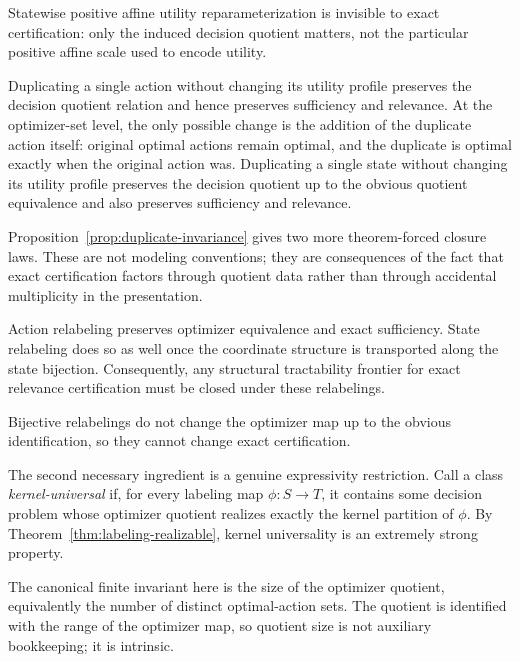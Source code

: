 Statewise positive affine utility reparameterization is invisible to exact certification: only the induced decision quotient matters, not the particular positive affine scale used to encode utility.

\begin{proposition}\label{prop:duplicate-invariance}
Duplicating a single action without changing its utility profile preserves the decision quotient relation and hence preserves sufficiency and relevance. At the optimizer-set level, the only possible change is the addition of the duplicate action itself: original optimal actions remain optimal, and the duplicate is optimal exactly when the original action was. Duplicating a single state without changing its utility profile preserves the decision quotient up to the obvious quotient equivalence and also preserves sufficiency and relevance.
\end{proposition}

Proposition~\ref{prop:duplicate-invariance} gives two more theorem-forced closure laws. These are not modeling conventions; they are consequences of the fact that exact certification factors through quotient data rather than through accidental multiplicity in the presentation.

\begin{proposition}\label{prop:relabeling-forced}
Action relabeling preserves optimizer equivalence and exact sufficiency. State relabeling does so as well once the coordinate structure is transported along the state bijection. Consequently, any structural tractability frontier for exact relevance certification must be closed under these relabelings.
\end{proposition}

Bijective relabelings do not change the optimizer map up to the obvious identification, so they cannot change exact certification.

The second necessary ingredient is a genuine expressivity restriction. Call a class \emph{kernel-universal} if, for every labeling map $\phi : S \to T$, it contains some decision problem whose optimizer quotient realizes exactly the kernel partition of $\phi$. By Theorem~\ref{thm:labeling-realizable}, kernel universality is an extremely strong property.

The canonical finite invariant here is the size of the optimizer quotient, equivalently the number of distinct optimal-action sets. The quotient is identified with the range of the optimizer map, so quotient size is not auxiliary bookkeeping; it is intrinsic.


